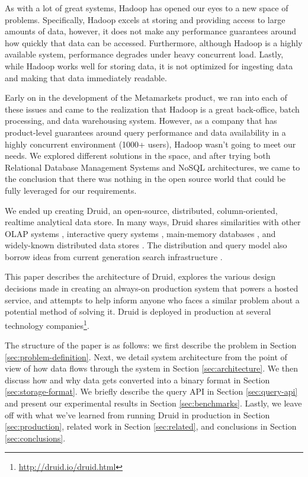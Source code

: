 \documentclass{acm_proc_article-sp}
\begin{document}
As with a lot of great systems, Hadoop has opened our eyes to a new space of
problems.  Specifically, Hadoop excels at storing and providing access to large
amounts of data, however, it does not make any performance guarantees around
how quickly that data can be accessed.  Furthermore, although Hadoop is a
highly available system, performance degrades under heavy concurrent load.
Lastly, while Hadoop works well for storing data, it is not optimized for
ingesting data and making that data immediately readable.

Early on in the development of the Metamarkets product, we ran into each of
these issues and came to the realization that Hadoop is a great back-office,
batch processing, and data warehousing system.  However, as a company that has
product-level guarantees around query performance and data availability in a
highly concurrent environment (1000+ users), Hadoop wasn't going to meet our
needs.  We explored different solutions in the space, and after
trying both Relational Database Management Systems and NoSQL architectures, we
came to the conclusion that there was nothing in the open source world that
could be fully leveraged for our requirements.

We ended up creating Druid, an open-source, distributed, column-oriented,
realtime analytical data store.  In many ways, Druid shares similarities with
other OLAP systems \cite{oehler2012ibm, schrader2009oracle, lachev2005applied},
interactive query systems \cite{melnik2010dremel}, main-memory databases
\cite{farber2012sap}, and widely-known distributed data stores
\cite{chang2008bigtable, decandia2007dynamo, lakshman2010cassandra}.  The
distribution and query model also borrow ideas from current generation search
infrastructure \cite{linkedin2013senseidb, apache2013solr,
banon2013elasticsearch}.

This paper describes the architecture of Druid, explores the various design
decisions made in creating an always-on production system that powers a hosted
service, and attempts to help inform anyone who faces a similar problem about a
potential method of solving it. Druid is deployed in production at several
technology
companies\footnote{\href{http://druid.io/druid.html}{http://druid.io/druid.html}}.

The structure of the paper is as follows: we first describe the problem in
Section \ref{sec:problem-definition}.  Next, we detail system architecture from
the point of view of how data flows through the system in Section
\ref{sec:architecture}.  We then discuss how and why data gets converted into a
binary format in Section \ref{sec:storage-format}.  We briefly describe the
query API in Section \ref{sec:query-api} and present our experimental results
in Section \ref{sec:benchmarks}. Lastly, we leave off with what we've learned from
running Druid in production in Section \ref{sec:production}, related work
in Section \ref{sec:related}, and conclusions in Section \ref{sec:conclusions}.
\end{document}
